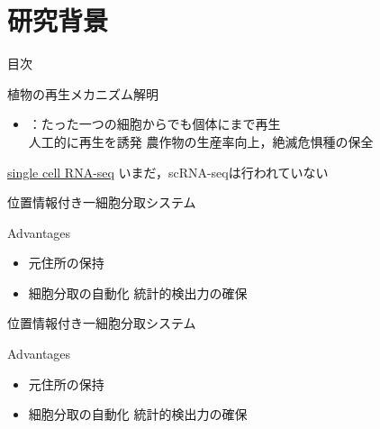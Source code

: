 \section{研究背景}

\begin{frame}[noframenumbering]{目次}
    \tableofcontents[currentsection]
\end{frame}

\begin{frame}{植物の再生メカニズム解明}
    \begin{itemize}
        \item {}：たった一つの細胞からでも個体にまで再生
        \\\ra 人工的に再生を誘発 \Ra 農作物の生産率向上，絶滅危惧種の保全
    \end{itemize}
    \vs
    \uline{single cell RNA-seq}
    \Ra いまだ，scRNA-seqは行われていない
\end{frame}

\begin{frame}{位置情報付き一細胞分取システム}
    \begin{block}{Advantages}
        \begin{itemize}
            \item 元住所の保持 \Ra {}
            \item 細胞分取の自動化 \Ra 統計的検出力の確保
        \end{itemize}
    \end{block}
\end{frame}
\begin{frame}[noframenumbering]{位置情報付き一細胞分取システム}
    \begin{block}{Advantages}
        \begin{itemize}
            \item 元住所の保持 \Ra {}
            \item 細胞分取の自動化 \Ra 統計的検出力の確保
        \end{itemize}
    \end{block}
\end{frame}